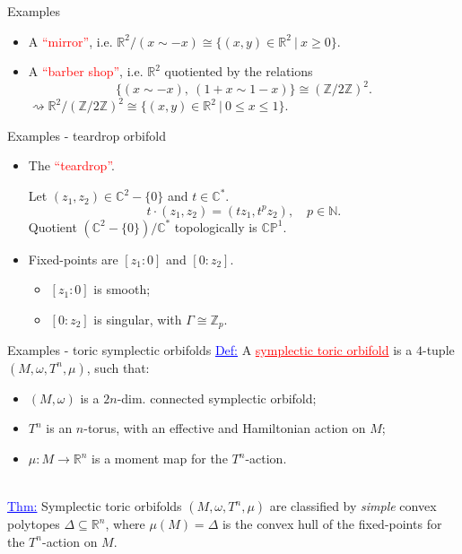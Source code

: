 \documentclass[aspectratio=169,xcolor=dvipsnames]{beamer}
\newcommand{\ra}{\rightarrow}
\newcommand{\NN}{\mathbb{N}}
\newcommand{\ZZ}{\mathbb{Z}}
\newcommand{\RR}{\mathbb{R}}
\newcommand{\CC}{\mathbb{C}}
\newcommand{\PP}{\mathbb{P}}
\newcommand{\w}{\omega}
\begin{document}
\begin{frame}{Examples}
	\begin{itemize}
		\item A \textcolor{red}{``mirror''}, i.e. $\RR^{2}/(x \sim -x) \cong \{(x,y) \in \RR^{2}\ |\ x \geq 0\}$.
		\hfill \break
		\item A \textcolor{red}{``barber shop''}, i.e. $\RR^{2}$ quotiented by the relations
		\[
		\{(x \sim -x),\ (1 + x \sim 1 - x)\} \cong (\ZZ/2\ZZ)^{2}.
		\]
		$\rightsquigarrow \RR^{2} / (\ZZ/2\ZZ)^{2} \cong \{(x,y) \in \RR^{2}\ |\ 0 \leq x \leq 1 \}$.
	\end{itemize}
\end{frame}

\begin{frame}{Examples - teardrop orbifold}
	\begin{itemize}
		\item The \textcolor{red}{``teardrop''}.
		
		Let $(z_{1}, z_{2}) \in \CC^{2} - \{0\}$ and $t \in \CC^{\ast}$.
		\[
		t \cdot (z_{1}, z_{2}) = (tz_{1}, t^{p}z_{2}), \quad p \in \NN.
		\]
		Quotient $\left(\CC^{2} - \{0\}\right)/\CC^{\ast}$ topologically is $\CC\PP^{1}$.
		\hfill \break
		\item Fixed-points are $[z_{1}:0]$ and $[0:z_{2}]$.
		\begin{itemize}
			\item $[z_{1}:0]$ is smooth;
			\item $[0:z_{2}]$ is singular, with $\Gamma \cong \ZZ_{p}$.
		\end{itemize}
	\end{itemize}
\end{frame}

\begin{frame}{Examples - toric symplectic orbifolds}
	\textcolor{blue}{\underline{Def:}} A \textcolor{red}{\underline{symplectic toric orbifold}} is a $4$-tuple $(M, \w, T^{n}, \mu)$, such that:
	\begin{itemize}
		\item $(M,\w)$ is a $2n$-dim. connected symplectic orbifold;
		\item $T^{n}$ is an $n$-torus, with an effective and Hamiltonian action on $M$;
		\item $\mu : M \ra \RR^{n}$ is a moment map for the $T^{n}$-action.
	\end{itemize}
	\hfill \\
	\textcolor{blue}{\underline{Thm:}} Symplectic toric orbifolds $(M, \w, T^{n}, \mu)$ are classified by \emph{simple} convex polytopes $\Delta \subseteq \RR^{n}$, where $\mu(M) = \Delta$ is the convex hull of the fixed-points for the $T^{n}$-action on $M$.
\end{frame}
\end{document}
